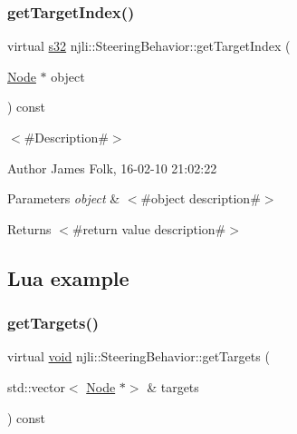 \subsubsection{\texorpdfstring{get\+Target\+Index()}{getTargetIndex()}}
{\footnotesize\ttfamily virtual \mbox{\hyperlink{_util_8h_aa62c75d314a0d1f37f79c4b73b2292e2}{s32}} njli\+::\+Steering\+Behavior\+::get\+Target\+Index (\begin{DoxyParamCaption}\item[{\mbox{\hyperlink{classnjli_1_1_node}{Node}} $\ast$}]{object }\end{DoxyParamCaption}) const\hspace{0.3cm}{\ttfamily [virtual]}}



$<$\#\+Description\#$>$ 

\begin{DoxyAuthor}{Author}
James Folk, 16-\/02-\/10 21\+:02\+:22
\end{DoxyAuthor}

\begin{DoxyParams}{Parameters}
{\em object} & $<$\#object description\#$>$\\
\hline
\end{DoxyParams}
\begin{DoxyReturn}{Returns}
$<$\#return value description\#$>$
\end{DoxyReturn}
\hypertarget{classnjli_1_1_steering_behavior_wander_ex1}{}\subsection{Lua example}\label{classnjli_1_1_steering_behavior_wander_ex1}

\begin{DoxyCodeInclude}
\end{DoxyCodeInclude}
\mbox{\label{classnjli_1_1_steering_behavior_acfac4925fbaa4c6e9a76efea3b015fa7}} 
\subsubsection{\texorpdfstring{get\+Targets()}{getTargets()}}
{\footnotesize\ttfamily virtual \mbox{\hyperlink{_thread_8h_af1e856da2e658414cb2456cb6f7ebc66}{void}} njli\+::\+Steering\+Behavior\+::get\+Targets (\begin{DoxyParamCaption}\item[{std\+::vector$<$ \mbox{\hyperlink{classnjli_1_1_node}{Node}} $\ast$$>$ \&}]{targets }\end{DoxyParamCaption}) const\hspace{0.3cm}{\ttfamily [virtual]}}



